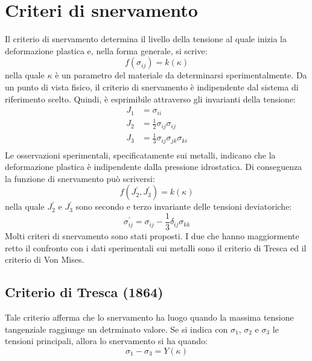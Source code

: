 \section{Criteri di snervamento}
Il criterio di snervamento determina il livello della tensione al quale inizia la deformazione plastica e, nella forma generale, si scrive:
\begin{equation}
	f(\sigma_{ij}) = k(\kappa)
\end{equation}
nella quale $\kappa$ è un parametro del materiale da determinarsi sperimentalmente. Da un punto di vista fisico, il criterio di snervamento è indipendente dal sistema di riferimento scelto. Quindi, è esprimibile attraverso gli invarianti della tensione:
\begin{equation}
\begin{split}
	J_1 & = \sigma_{ii}                                     \\
	J_2 & = \frac{1}{2}\sigma_{ij} \sigma_{ij}              \\
	J_3 & = \frac{1}{3} \sigma_{ij} \sigma_{jk} \sigma_{ki}	\\	
\end{split}
\end{equation}
Le osservazioni sperimentali, specificatamente sui metalli, indicano che la deformazione plastica è indipendente dalla pressione idrostatica. Di conseguenza la funzione di snervamento può scriversi:
\begin{equation}
	f(J_2^{'}, J_3^{'}) = k(\kappa)
\end{equation}
nella quale $J_2^{'}$ e $J_3^{'}$ sono secondo e terzo invariante delle tensioni deviatoriche:
\begin{equation}
	\sigma_{ij}^{'} = \sigma_{ij} - \frac{1}{3} \delta_{ij} \sigma_{kk}
\end{equation}
Molti criteri di snervamento sono stati proposti. I due che hanno maggiormente retto il confronto con i dati sperimentali sui metalli sono il criterio di Tresca ed il criterio di Von Mises.

\subsection{Criterio di Tresca (1864)}
Tale criterio afferma che lo snervamento ha luogo quando la massima tensione tangenziale raggiunge un detrminato valore. Se si indica con $\sigma_1$, $\sigma_2$ e $\sigma_3$  le tensioni principali, allora lo snervamento si ha quando:
\begin{equation}
	\sigma_1 - \sigma_3 = Y(\kappa)
\end{equation}

